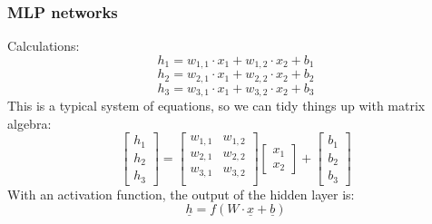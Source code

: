 \documentclass{beamer}
\begin{document}
\begin{frame}
    \frametitle{MLP networks}
    Calculations:
    \[h_{1} = w_{1, 1} \cdot x_1 + w_{1, 2} \cdot x_2 + b_{1}\]
    \[h_{2} = w_{2, 1} \cdot x_1 + w_{2, 2} \cdot x_2 + b_{2}\]
    \[h_{3} = w_{3, 1} \cdot x_1 + w_{3, 2} \cdot x_2 + b_{3}\] \pause
    This is a typical system of equations, so we can tidy things up with matrix algebra: \pause
    \[
        \begin{bmatrix}
            h_{1} \\
            h_{2} \\
            h_{3}
        \end{bmatrix}
        =
        \begin{bmatrix}
            w_{1, 1} & w_{1, 2} \\
            w_{2, 1} & w_{2, 2} \\
            w_{3, 1} & w_{3, 2} \\
        \end{bmatrix}
        \begin{bmatrix}
            x_1 \\
            x_2
        \end{bmatrix}
        +
        \begin{bmatrix}
            b_1 \\
            b_2 \\
            b_3
        \end{bmatrix}
    \] \pause
    With an activation function, the output of the hidden layer is:
    \[\underline{h} = f(W \cdot \underline{x} + \underline{b})\]
\end{frame}

\end{document}
